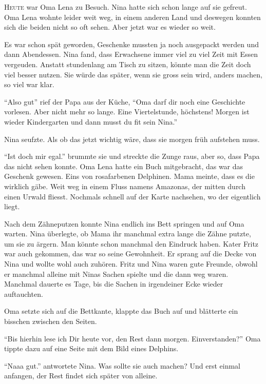 \begin{mdframed}[style=mystyle]
\lettrine[lines=3]{\color{red}H}{eute} war Oma Lena zu Besuch. Nina hatte sich schon lange auf sie gefreut. Oma Lena wohnte leider weit weg, in einem anderen Land und deswegen konnten sich die beiden nicht so oft sehen. Aber jetzt war es wieder so weit. 

Es war schon spät geworden, Geschenke mussten ja noch ausgepackt werden und dann Abendessen. Nina fand, dass Erwachsene immer viel zu viel Zeit mit Essen vergeuden. Anstatt stundenlang am Tisch zu sitzen, könnte man die Zeit doch viel besser nutzen. Sie würde das später, wenn sie gross sein wird, anders machen, so viel war klar.

\enquote{Also gut} rief der Papa aus der Küche, \enquote{Oma darf dir noch eine Geschichte vorlesen. Aber nicht mehr so lange. Eine Viertelstunde, höchstens! Morgen ist wieder Kindergarten und dann musst du fit sein Nina.}

Nina seufzte. Als ob das jetzt wichtig wäre, dass sie morgen früh aufstehen muss. 

\enquote{Ist doch mir egal.} brummte sie und streckte die Zunge raus, aber so, dass Papa das nicht sehen konnte. Oma Lena hatte ein Buch mitgebracht, das war das Geschenk gewesen. Eins von rosafarbenen Delphinen. Mama meinte, dass es die wirklich gäbe. Weit weg in einem Fluss namens Amazonas, der mitten durch einen Urwald fliesst. Nochmals schnell auf der Karte nachsehen, wo der eigentlich liegt.

Nach dem Zähneputzen konnte Nina endlich ins Bett springen und auf Oma warten. Nina überlegte, ob Mama ihr manchmal extra lange die Zähne putzte, um sie zu ärgern. Man könnte schon manchmal den Eindruck haben. Kater Fritz war auch gekommen, das war so seine Gewohnheit. Er sprang auf die Decke von Nina und wollte wohl auch zuhören. Fritz und Nina waren gute Freunde, obwohl er manchmal alleine mit Ninas Sachen spielte und die dann weg waren. Manchmal dauerte es Tage, bis die Sachen in irgendeiner Ecke wieder auftauchten. 

Oma setzte sich auf die Bettkante, klappte das Buch auf und blätterte ein bisschen zwischen den Seiten.

\enquote{Bis hierhin lese ich Dir heute vor, den Rest dann morgen. Einverstanden?} Oma tippte dazu auf eine Seite mit dem Bild eines Delphins. 

\enquote{Naaa gut.} antwortete Nina. Was sollte sie auch machen? Und erst einmal anfangen, der Rest findet sich später von alleine.
\end{mdframed}\medskip


